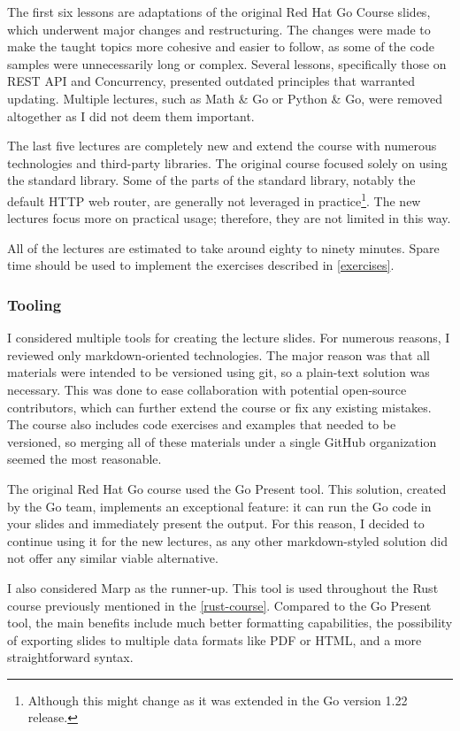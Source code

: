 \documentclass[
  digital,
  color,
  oneside,
  nosansbold,
  nocolorbold,
  lof,
  nolot,
]{fithesis4}
\begin{document}
The first six lessons are adaptations of the original Red Hat Go Course slides, which underwent major changes and restructuring. The changes were made to make the taught topics more cohesive and easier to follow, as some of the code samples were unnecessarily long or complex. Several lessons, specifically those on REST API and Concurrency, presented outdated principles that warranted updating. Multiple lectures, such as Math \& Go or Python \& Go, were removed altogether as I did not deem them important.

The last five lectures are completely new and extend the course with numerous technologies and third-party libraries. The original course focused solely on using the standard library. Some of the parts of the standard library, notably the default HTTP web router, are generally not leveraged in practice\footnote{Although this might change as it was extended in the Go version 1.22 release.}. The new lectures focus more on practical usage; therefore, they are not limited in this way.

All of the lectures are estimated to take around eighty to ninety minutes. Spare time should be used to implement the exercises described in \cref{exercises}.

\subsubsection{Tooling}

I considered multiple tools for creating the lecture slides. For numerous reasons, I reviewed only markdown-oriented technologies. The major reason was that all materials were intended to be versioned using git, so a plain-text solution was necessary. This was done to ease collaboration with potential open-source contributors, which can further extend the course or fix any existing mistakes. The course also includes code exercises and examples that needed to be versioned, so merging all of these materials under a single GitHub organization seemed the most reasonable.

The original Red Hat Go course used the Go Present tool\cite{go-present}. This solution, created by the Go team, implements an exceptional feature: it can run the Go code in your slides and immediately present the output. For this reason, I decided to continue using it for the new lectures, as any other markdown-styled solution did not offer any similar viable alternative.

I also considered Marp\cite{marp} as the runner-up. This tool is used throughout the Rust course previously mentioned in the \cref{rust-course}. Compared to the Go Present tool, the main benefits include much better formatting capabilities, the possibility of exporting slides to multiple data formats like PDF or HTML, and a more straightforward syntax.
\end{document}
